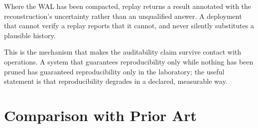 \begin{invariant}
\label{inv:replay-degradation}
Where the WAL has been compacted, replay returns a result annotated with the reconstruction's uncertainty rather than an unqualified answer. A deployment that cannot verify a replay reports that it cannot, and never silently substitutes a plausible history.
\end{invariant}

This is the mechanism that makes the auditability claim survive contact with operations. A system that guarantees reproducibility only while nothing has been pruned has guaranteed reproducibility only in the laboratory; the useful statement is that reproducibility degrades in a declared, measurable way.

\section{Comparison with Prior Art}
\label{sec:architecture:prior-art}

